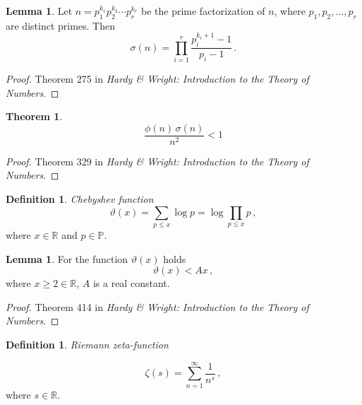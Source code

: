 \documentclass{article}
\theoremstyle{definition}
\newtheorem{definition}[subsubsection]{Definition}
\newtheorem{lemma}[subsubsection]{Lemma}
\newtheorem{theorem}[subsubsection]{Theorem}
\begin{document}
\begin{lemma}
\label{lemma:sigma}
Let $n=p_1^{k_1}p_2^{k_2}\cdots p_r^{k_r}$ be the prime factorization of $n$, where $p_1,p_2,...,p_r$ are distinct primes. Then
\begin{equation*}
    \sigma(n)=\prod_{i=1}^r \frac{p_i^{k_i+1}-1}{p_i-1}\,.
\end{equation*}

\begin{proof}
Theorem 275 in \textit{Hardy \& Wright: Introduction to the Theory of Numbers}.
\end{proof}
\end{lemma}

\begin{theorem}
\label{thm:sigmafii}
\begin{equation*}
    \frac{\phi(n)\,\sigma(n)}{n^2}<1
\end{equation*}

\begin{proof}
Theorem 329 in \textit{Hardy \& Wright: Introduction to the Theory of Numbers}.
\end{proof}
\end{theorem}


\begin{definition}{\emph{Chebyshev function}}
\begin{equation*}
    \vartheta(x)=\sum_{p\leq x} \log p = \log \prod_{p\leq x} p\,,
\end{equation*}
where $x\in\mathbb{R}$ and $p\in\mathbb{P}$.

\end{definition}

\begin{lemma}
\label{lemma:vartheta}
For the function $\vartheta(x)$ holds
\begin{equation*}
    \vartheta(x) < Ax\,,
\end{equation*}
where $x\geq2\in\mathbb{R}$, $A$ is a real constant.

\begin{proof}
Theorem 414 in \textit{Hardy \& Wright: Introduction to the Theory of Numbers}.
\end{proof}
\end{lemma}

\begin{definition}{\emph{Riemann zeta-function}}

\begin{equation*}
    \zeta(s)=\sum_{n=1}^\infty \frac{1}{n^s}\,,
\end{equation*}
where $s\in\mathbb{R}$.
\end{definition}
\end{document}
